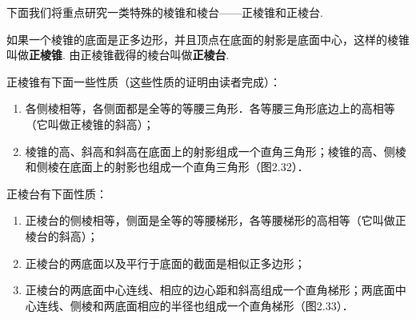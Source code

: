 下面我们将重点研究一类特殊的棱锥和棱台——正棱锥和正棱台. 

\begin{figure}[htp]
    \centering
{}
    \caption{}
\end{figure}

如果一个棱锥的底面是正多边形，并且顶点在底面的射影是底面中心，这样的棱锥叫做\textbf{正棱锥}. 由正棱锥截得的棱台叫做\textbf{正棱台}.

正棱锥有下面一些性质（这些性质的证明由读者完成）：
\begin{enumerate}[(1)]
\item 各侧棱相等，各侧面都是全等的等腰三角形．各等腰三角形底边上的高相等（它叫做正棱锥的斜高）；
\item 棱锥的高、斜高和斜高在底面上的射影组成一个直角三角形；棱锥的高、侧棱和侧棱在底面上的射影也组成一个直角三角形（图2.32）．
\end{enumerate}

正棱台有下面性质：
\begin{enumerate}[(1)]
    \item 正棱台的侧棱相等，侧面是全等的等腰梯形，各等腰梯形的高相等（它叫做正棱台的斜高）；
    \item 正棱台的两底面以及平行于底面的截面是相似正多边形；
    \item 正棱台的两底面中心连线、相应的边心距和斜高组成一个直角梯形；两底面中心连线、侧棱和两底面相应的半径也组成一个直角梯形（图2.33）．
\end{enumerate}


